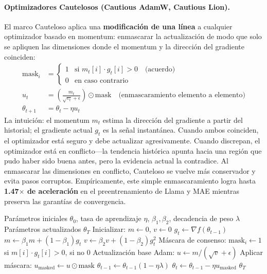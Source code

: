 \documentclass[11pt,a4paper]{article}
\begin{document}
\paragraph{Optimizadores Cautelosos (Cautious AdamW, Cautious Lion).}
El marco Cauteloso aplica una \textbf{modificación de una línea} a cualquier optimizador basado en momentum: enmascarar la actualización de modo que solo se apliquen las dimensiones donde el momentum y la dirección del gradiente coinciden:
\begin{align}
\text{mask}_i &= \begin{cases} 1 & \text{si } m_t[i] \cdot g_t[i] > 0 \quad\text{(acuerdo)} \\ 0 & \text{en caso contrario} \end{cases} \\
u_t &= \left(\frac{m_t}{\sqrt{v_t}+\epsilon}\right) \odot \text{mask} \quad\text{(enmascaramiento elemento a elemento)} \\
\theta_{t+1} &= \theta_t - \eta u_t
\end{align}
La intuición: el momentum $m_t$ estima la dirección del gradiente a partir del historial; el gradiente actual $g_t$ es la señal instantánea. Cuando ambos coinciden, el optimizador está seguro y debe actualizar agresivamente. Cuando discrepan, el optimizador está en conflicto---la tendencia histórica apunta hacia una región que pudo haber sido buena antes, pero la evidencia actual la contradice. Al enmascarar las dimensiones en conflicto, Cauteloso se vuelve más conservador y evita pasos corruptos. Empíricamente, este simple enmascaramiento logra hasta \textbf{1.47$\times$ de aceleración} en el preentrenamiento de Llama y MAE mientras preserva las garantías de convergencia.

\begin{algorithm}[H]
\caption{Cautious AdamW (Enmascaramiento de Actualización por Consenso)}
\label{alg:cautious}
\begin{algorithmic}[1]
\Require Parámetros iniciales $\theta_0$, tasa de aprendizaje $\eta$, $\beta_1, \beta_2$, decadencia de peso $\lambda$
\Ensure Parámetros actualizados $\theta_T$
\State Inicializar: $m \gets 0$, $v \gets 0$
    \State $g_t \gets \nabla f(\theta_{t-1})$
    \State $m \gets \beta_1 m + (1-\beta_1) g_t$
    \State $v \gets \beta_2 v + (1-\beta_2) g_t^2$
    \State Máscara de consenso: $\text{mask}_i \gets 1$ si $m[i] \cdot g_t[i] > 0$, si no $0$ 
    \State Actualización base Adam: $u \gets m / (\sqrt{v} + \epsilon)$
    \State Aplicar máscara: $u_{\text{masked}} \gets u \odot \text{mask}$ 
        \State $\theta_{t-1} \gets \theta_{t-1}(1 - \eta\lambda)$
    \EndIf
    \State $\theta_t \gets \theta_{t-1} - \eta u_{\text{masked}}$
\EndFor
\Return $\theta_T$
\end{algorithmic}
\end{algorithm}
\end{document}
